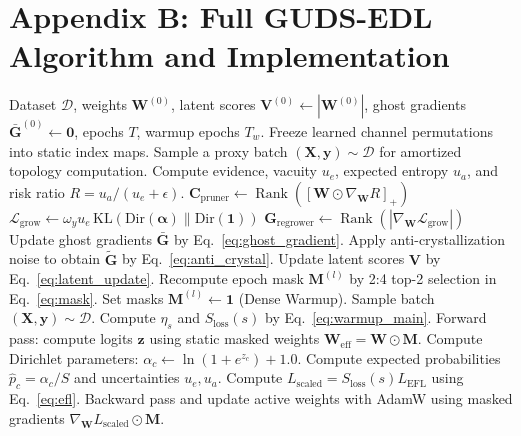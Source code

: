\documentclass[letterpaper]{article} %
\newcommand{\Dir}{\text{Dir}}
\newcommand{\KL}{\text{KL}}
\newcommand{\pospart}[1]{\left[#1\right]_+}
\begin{document}
\section{Appendix B: Full GUDS-EDL Algorithm and Implementation}
\begin{algorithm}[H]
\caption{Universal GUDS-EDL Training and Optimization Loop}
\label{alg:guds_edl}
\begin{algorithmic}[1]
\REQUIRE Dataset $\mathcal{D}$, weights $\bm{W}^{(0)}$, latent scores $\bm{V}^{(0)} \leftarrow |\bm{W}^{(0)}|$, ghost gradients $\bar{\bm{G}}^{(0)}\leftarrow\bm{0}$, epochs $T$, warmup epochs $T_w$.
        \STATE Freeze learned channel permutations into static index maps.
    \ENDIF
        \STATE Sample a proxy batch $(\bm{X}, \bm{y}) \sim \mathcal{D}$ for amortized topology computation.
        \STATE Compute evidence, vacuity $u_e$, expected entropy $u_a$, and risk ratio $R=u_a/(u_e+\epsilon)$.
        \STATE \quad $\bm{C}_{\text{pruner}} \leftarrow \operatorname{Rank}\!\left(\pospart{\bm{W}\odot\nabla_{\bm{W}}R}\right)$
        \STATE \quad $\mathcal{L}_{\text{grow}} \leftarrow \omega_y u_e\, \KL(\Dir(\bm{\alpha}) \parallel \Dir(\mathbf{1}))$
        \STATE \quad $\bm{G}_{\text{regrower}} \leftarrow \operatorname{Rank}\!\left(|\nabla_{\bm{W}}\mathcal{L}_{\text{grow}}|\right)$
        \STATE Update ghost gradients $\bar{\bm{G}}$ by Eq.~\ref{eq:ghost_gradient}.
        \STATE Apply anti-crystallization noise to obtain $\tilde{\bm{G}}$ by Eq.~\ref{eq:anti_crystal}.
        \STATE Update latent scores $\bm{V}$ by Eq.~\ref{eq:latent_update}.
        \STATE Recompute epoch mask $\bm{M}^{(l)}$ by 2:4 top-2 selection in Eq.~\ref{eq:mask}.
    \ELSE
        \STATE Set masks $\bm{M}^{(l)} \leftarrow \mathbf{1}$ (Dense Warmup).
    \ENDIF
        \STATE Sample batch $(\bm{X}, \bm{y}) \sim \mathcal{D}$.
        \STATE Compute $\eta_s$ and $S_{\text{loss}}(s)$ by Eq.~\ref{eq:warmup_main}.
        \STATE Forward pass: compute logits $\bm{z}$ using static masked weights $\bm{W}_{\text{eff}} = \bm{W} \odot \bm{M}$.
        \STATE Compute Dirichlet parameters: $\alpha_c \leftarrow \ln(1 + e^{z_c}) + 1.0$.
        \STATE Compute expected probabilities $\hat{p}_c = \alpha_c/S$ and uncertainties $u_e, u_a$.
        \STATE Compute $L_{\text{scaled}}=S_{\text{loss}}(s)L_{\text{EFL}}$ using Eq.~\ref{eq:efl}.
        \STATE Backward pass and update active weights with AdamW using masked gradients $\nabla_{\bm{W}}L_{\text{scaled}}\odot\bm{M}$.
    \ENDFOR
\ENDFOR
\end{algorithmic}
\end{algorithm}
\end{document}
